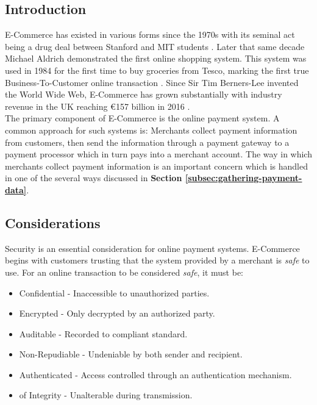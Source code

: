 
\subsection{Introduction}
\label{sec:payment-intro}

E-Commerce has existed in various forms since the 1970s with its seminal act being a drug deal between Stanford and MIT students \cite{power-mike-online-highs}. Later that same decade Michael Aldrich demonstrated the first online shopping system. This system was used in 1984 for the first time to buy groceries from Tesco, marking the first true Business-To-Customer online transaction \cite{winterman-kelly-online-shopper}. Since Sir Tim Berners-Lee invented the World Wide Web, E-Commerce has grown substantially with industry revenue in the UK reaching \euro{157 billion} in 2016 \cite{khaksar-2016}.\\

The primary component of E-Commerce is the online payment system. A common approach for such systems is: Merchants collect payment information from customers, then send the information through a payment gateway to a payment processor which in turn pays into a merchant account. The way in which merchants collect payment information is an important concern which is handled in one of the several ways discussed in \textbf{Section \ref{subsec:gathering-payment-data}}.

\subsection{Considerations}
\label{subsec:considerations}

Security is an essential consideration for online payment systems. E-Commerce begins with customers trusting that the system provided by a merchant is \textit{safe} to use. For an online transaction to be considered \textit{safe}, it must be:

\begin{itemize}
	  \item Confidential - Inaccessible to unauthorized parties.
    \item Encrypted - Only decrypted by an authorized party.
    \item Auditable - Recorded to compliant standard.
    \item Non-Repudiable - Undeniable by both sender and recipient.
    \item Authenticated - Access controlled through an authentication mechanism.
    \item of Integrity - Unalterable during transmission.
\end{itemize}

